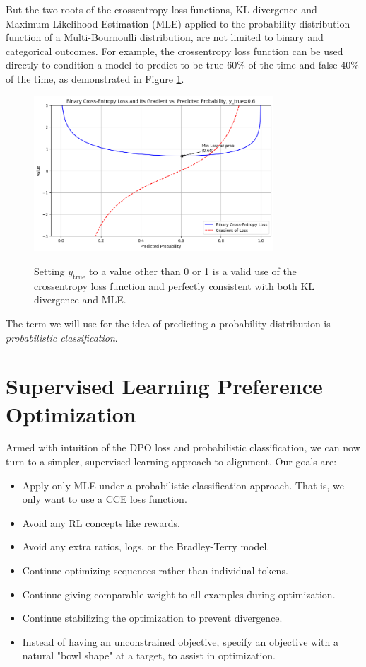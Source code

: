 \documentclass[twoside,11pt]{article}
\begin{document}
But the two roots of the crossentropy
loss functions, KL divergence and Maximum Likelihood Estimation (MLE) applied
to the probability distribution function of a Multi-Bournoulli
distribution, are not limited to binary and categorical outcomes. 
For example, the crossentropy loss function can be used directly 
to condition a model to predict to be true 60\% of the time and false 40\% of 
the time, as demonstrated in Figure \ref{fig:ce06}. 
\begin{figure}[htbp]
  \centering
  \includegraphics[width=0.8\textwidth]{ce06.png}
  \label{fig:ce06}
  \caption{Setting $y_\mathrm{true}$ to a value 
  other than 0 or 1 is a valid 
  use of the crossentropy loss 
  function and perfectly consistent with
  both KL divergence and MLE.}
\end{figure}

The term we will use for the idea of
predicting a probability distribution is \emph{probabilistic classification}.

\section{Supervised Learning Preference Optimization}

Armed with intuition of the DPO loss and probabilistic classification, we can
now turn to a simpler, supervised learning approach to alignment. Our
goals are:
\begin{itemize}
\item Apply only MLE under a probabilistic classification approach. 
  That is, we only want to use a CCE loss function. 
\item Avoid any RL concepts like rewards.
\item Avoid any extra ratios, logs, or the Bradley-Terry model.
\item Continue optimizing sequences rather than individual tokens.
\item Continue giving comparable weight to all examples during optimization.
\item Continue stabilizing the optimization to prevent divergence.  
\item Instead of having an unconstrained objective, 
  specify an objective with a natural "bowl shape" at a target, to assist
  in optimization.
\end{itemize} 
\end{document}
